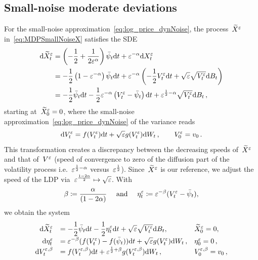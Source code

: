 \subsection{Small-noise moderate deviations}\label{sec:SmallNoiseMDP}
For the small-noise approximation~\eqref{eq:log_price_dynNoise}, the process~$\widetilde{X}^\varepsilon$ in~\eqref{eq:MDPSmallNoiseX} satisfies the SDE
\begin{align*}
\mathrm{d} \widetilde{X}^\varepsilon_t
 & = \displaystyle\left(-\frac{1}{2} + \frac{1}{2\varepsilon^{\alpha}}\right)\bar\psi_t\mathrm{d} t
+ \varepsilon^{-\alpha}\mathrm{d} X^{\varepsilon}_t\\
 & = \displaystyle-\frac{1}{2}\left(1 - \varepsilon^{-\alpha}\right)\bar\psi_t\mathrm{d} t
+ \varepsilon^{-\alpha}\left(-\frac{1}{2}V_t^\varepsilon \mathrm{d} t + \sqrt{\varepsilon}\sqrt{V_t^\varepsilon} \mathrm{d} B_t\right)\\
 & = \displaystyle
 -\frac{1}{2}\bar\psi_t\mathrm{d} t - \frac{1}{2}\varepsilon^{-\alpha}\left( V_t^\varepsilon - \bar\psi_t\right) \mathrm{d} t + 
\varepsilon^{\frac{1}{2}-\alpha}\sqrt{V_t^\varepsilon} \mathrm{d} B_t\,,
\end{align*}
starting at~$\widetilde{X}^{\varepsilon}_0 = 0$, where the small-noise approximation~\eqref{eq:log_price_dynNoise} of the variance reads
$$
\mathrm{d} V_t^{\varepsilon} = \displaystyle  f(V_t^{\varepsilon})\mathrm{d} t + \sqrt{\varepsilon} g(V_t^{\varepsilon})\mathrm{d} W_t\,, 
\qquad V_0^{\varepsilon} = v_0\,.
$$
This transformation creates a discrepancy between the decreasing speeds of~$\widetilde{X}^{\varepsilon}$ and that of~$V^{\varepsilon}$ (speed of convergence to zero of the diffusion part of the volatility process i.e.~$\varepsilon^{\frac{1}{2} - \alpha}$ versus~$\varepsilon^{\frac{1}{2}}$). Since~$\widetilde{X}^{\varepsilon}$ is our reference, %
we adjust the speed of the LDP via~$\varepsilon^{\frac{1 - 2\alpha}{2}}\mapsto \sqrt{\varepsilon}$. With 
\[\beta \coloneqq \frac{\alpha}{(1 - 2\alpha)} \quad \textup{ and } \quad \eta^\varepsilon_t \coloneqq \varepsilon^{-\beta}(V_t^\varepsilon - \bar\psi_t),\]
we obtain the system
\begin{equation}\label{eq:eps_MDP__eta_V}
\def\arraystretch{1.25}
\begin{array}{rll}
\D \widetilde{X}^\eps_t & = \displaystyle -\frac{1}{2}\bar\psi_t \D t -\frac{1}{2}\eta^\eps_t \D t + \sqrt{\eps}\sqrt{V_t^\eps} \D B_t, 
& \widetilde{X}_0^\eps = 0,\\
\D \eta_{t}^\eps & = \displaystyle \eps^{-\beta}(f(V_t^\eps)-f(\bar\psi_t))\D t + \sqrt{\eps}g(V_t^\eps)\D W_t\,, & \eta_{0}^\eps = 0\,,\\
\D V_t^{\eps,\beta} & = \displaystyle  f(V_t^{\eps,\beta})\D t + \eps^{\frac{1}{2} + \beta}g(V_t^{\eps,\beta})\D W_t\,, & V_0^{\eps,\beta} = v_0\,,
\end{array}
\end{equation}
